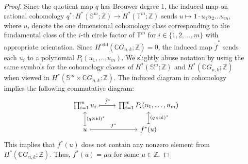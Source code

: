 \documentclass{amsart}
\newtheorem{remark}[theorem]{Remark}
\newcommand{\thmref}[1]{Theorem~\ref{#1}}
\begin{document}
\begin{proof}
		Since the %
quotient map $q$ has Brouwer degree 1, the induced map on rational cohomology $q^*: H^*(\mathbb{S}^m; \mathbb{Z}) \rightarrow H^*(\mathbb{T}^m;\mathbb{Z})$ %
sends $u\mapsto 1\cdot u_1 u_2 \dots u_m$, where %
$u_i$ denote the one dimensional cohomology class corresponding to the fundamental class of the $i$-th circle factor of $\mathbb T^m$ for $i\in \{1,2,\ldots,m\}$ with appropriate orientation. 
		Since $H^{\mathrm{odd}}(\mathbb{C}G_{n,k};\mathbb Z)=0$, the induced map $\tilde f^*$ sends each $u_i$ to a polynomial $P_i(u_1,\dots,u_m)$.  We slightly abuse notation by using the same symbols for the cohomology classes of $H^*(\mathbb S^m;\mathbb Z)$ and $H^*(\mathbb{C}G_{n,k};\mathbb Z)$ when viewed in $H^*(\mathbb S^m\times \mathbb CG_{n,k};\mathbb Z)$.
		The induced diagram in cohomology implies the following %
commutative diagram:
		\[
		\begin{tikzcd}
			{\prod_{i=1}^m u_i} & {\prod_{i=1}^m P_i(u_1,\ldots,u_m)} \\
			u & {f^*(u)}
			\arrow["{\tilde f^*}", maps to, from=1-1, to=1-2]
			\arrow["{(q\times \mathrm{id})^*}"', maps to, from=2-1, to=1-1]
			\arrow["{f^*}", maps to, from=2-1, to=2-2]
			\arrow["{(q\times \mathrm{id})^*}"', maps to, from=2-2, to=1-2]
		\end{tikzcd}
		\]
		This %
implies that $f^*(u)$ does not contain any nonzero element from $H^*(\mathbb{C}G_{n,k};\mathbb Z)$.  
		Thus, $f^*(u)=\mu u$ for some $\mu\in \mathbb Z$.
	\end{proof}
	
	
	
	
	
	
	
\end{document}

